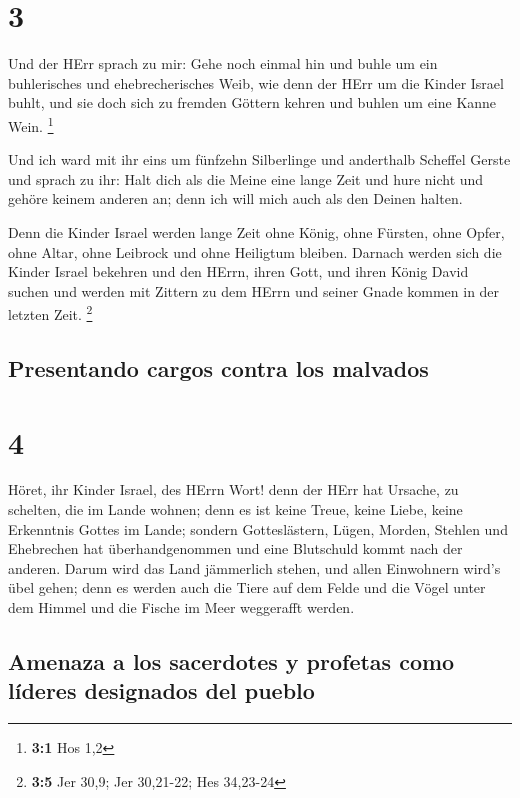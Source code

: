 \hypertarget{section-2}{%
\section{3}\label{section-2}}

 Und der HErr sprach zu mir: Gehe noch einmal hin und
buhle um ein buhlerisches und ehebrecherisches Weib, wie denn der HErr
um die Kinder Israel buhlt, und sie doch sich zu fremden Göttern kehren
und buhlen um eine Kanne Wein. \footnote{\textbf{3:1} Hos 1,2}

 Und ich ward mit ihr eins um fünfzehn Silberlinge und
anderthalb Scheffel Gerste  und sprach zu ihr: Halt dich
als die Meine eine lange Zeit und hure nicht und gehöre keinem anderen
an; denn ich will mich auch als den Deinen halten.

 Denn die Kinder Israel werden lange Zeit ohne König, ohne
Fürsten, ohne Opfer, ohne Altar, ohne Leibrock und ohne Heiligtum
bleiben.  Darnach werden sich die Kinder Israel bekehren
und den HErrn, ihren Gott, und ihren König David suchen und werden mit
Zittern zu dem HErrn und seiner Gnade kommen in der letzten Zeit.
\footnote{\textbf{3:5} Jer 30,9; Jer 30,21-22; Hes 34,23-24}

\hypertarget{presentando-cargos-contra-los-malvados}{%
\subsection{Presentando cargos contra los
malvados}\label{presentando-cargos-contra-los-malvados}}

\hypertarget{section-3}{%
\section{4}\label{section-3}}

 Höret, ihr Kinder Israel, des HErrn Wort! denn der HErr
hat Ursache, zu schelten, die im Lande wohnen; denn es ist keine Treue,
keine Liebe, keine Erkenntnis Gottes im Lande;  sondern
Gotteslästern, Lügen, Morden, Stehlen und Ehebrechen hat
überhandgenommen und eine Blutschuld kommt nach der anderen.
 Darum wird das Land jämmerlich stehen, und allen
Einwohnern wird's übel gehen; denn es werden auch die Tiere auf dem
Felde und die Vögel unter dem Himmel und die Fische im Meer weggerafft
werden.

\hypertarget{amenaza-a-los-sacerdotes-y-profetas-como-luxedderes-designados-del-pueblo}{%
\subsection{Amenaza a los sacerdotes y profetas como líderes designados
del
pueblo}\label{amenaza-a-los-sacerdotes-y-profetas-como-luxedderes-designados-del-pueblo}}

